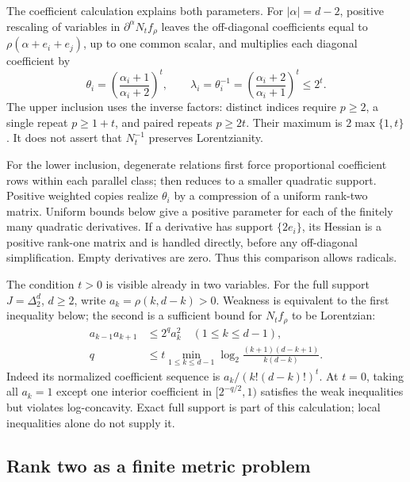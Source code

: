 The coefficient calculation explains both parameters. For
$|\alpha|=d-2$, positive rescaling of variables in
$\partial^\alpha N_tf_\rho$ leaves the off-diagonal coefficients
equal to $\rho(\alpha+e_i+e_j)$, up to one common scalar, and
multiplies each diagonal coefficient by
\begin{equation*}
 \theta_i=\left(\frac{\alpha_i+1}{\alpha_i+2}\right)^t,
 \qquad
 \lambda_i=\theta_i^{-1}
          =\left(\frac{\alpha_i+2}{\alpha_i+1}\right)^t
          \leq2^t.
 \tag{H.100}\label{eq:appH-triangular-diagonal-factors}
\end{equation*}
The upper inclusion uses the inverse factors: distinct indices
require $p\geq2$, a single repeat $p\geq1+t$, and paired repeats
$p\geq2t$. Their maximum is $2\max\{1,t\}$.
It does not assert that $N_t^{-1}$ preserves Lorentzianity.

For the lower inclusion, degenerate relations first force
proportional coefficient rows within each parallel class;
\cite[Theorem~4.7]{BakerHuhKummerLorscheid25TopologicalV3}
then reduces to a smaller quadratic support. Positive weighted
copies realize $\theta_i$ by a compression of a uniform rank-two
matrix. Uniform bounds below give a positive parameter for each
of the finitely many quadratic derivatives. If a derivative has
support $\{2e_i\}$, its Hessian is a positive rank-one matrix and
is handled directly, before any off-diagonal simplification.
Empty derivatives are zero. Thus this comparison allows radicals.

The condition $t>0$ is visible already in two variables. For
the full support $J=\Delta_2^d$, $d\geq2$, write
$a_k=\rho(k,d-k)>0$. Weakness is equivalent to the first
inequality below; the second is a sufficient bound for
$N_tf_\rho$ to be Lorentzian:
\begin{equation*}
 \begin{aligned}
 a_{k-1}a_{k+1}&\leq2^q a_k^2\quad(1\leq k\leq d-1),\\
 q&\leq t\min_{1\leq k\leq d-1}
       \log_2\frac{(k+1)(d-k+1)}{k(d-k)}.
 \end{aligned}
 \tag{H.101}\label{eq:appH-triangular-binary-bound}
\end{equation*}
Indeed its normalized coefficient sequence is
$a_k/(k!(d-k)!)^t$. At $t=0$, taking all $a_k=1$ except one
interior coefficient in $[2^{-q/2},1)$ satisfies the weak
inequalities but violates log-concavity. Exact full support is
part of this calculation; local inequalities alone do not supply it.

\subsection{Rank two as a finite metric problem}
\label{sec:appH-triangular-metric}

